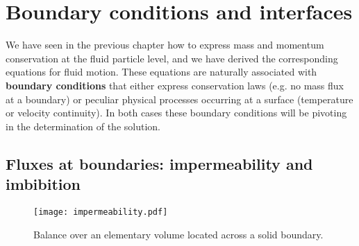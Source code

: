 \chapter{Boundary conditions and interfaces}
\label{chap:boundary_conditions}
We have seen in the previous chapter how to express mass and momentum conservation at the fluid particle level, and we have derived the corresponding equations for fluid motion. These equations are naturally associated with \textbf{boundary conditions} that either express conservation laws (e.g. no mass flux at a boundary) or peculiar physical processes occurring at a surface (temperature or velocity continuity). In both cases these boundary conditions will be pivoting in the determination of the solution.
\section{Fluxes at boundaries: impermeability and imbibition}
\begin{figure}[htbp]
\begin{center}
\texttt{[image: impermeability.pdf]}
\caption{Balance over an elementary volume located across a solid boundary.}
\label{fig:impermeability}
\end{center}
\end{figure}

